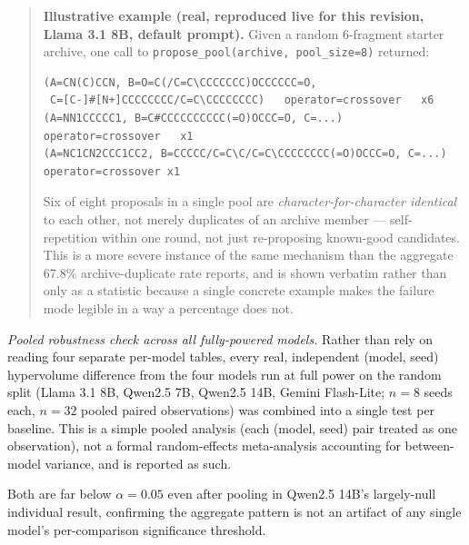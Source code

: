 \documentclass{article}
\begin{document}
\begin{quote}
\footnotesize
\textbf{Illustrative example (real, reproduced live for this revision, Llama 3.1 8B, default
prompt).} Given a random 6-fragment starter archive, one call to
\texttt{propose\_pool(archive, pool\_size=8)} returned:
\begin{verbatim}
(A=CN(C)CCN, B=O=C(/C=C\CCCCCCC)OCCCCCC=O,
 C=[C-]#[N+]CCCCCCCC/C=C\CCCCCCCC)   operator=crossover   x6
(A=NN1CCCCC1, B=C#CCCCCCCCCC(=O)OCCC=O, C=...)             operator=crossover   x1
(A=NC1CN2CCC1CC2, B=CCCCC/C=C\C/C=C\CCCCCCCC(=O)OCCC=O, C=...) operator=crossover x1
\end{verbatim}
Six of eight proposals in a single pool are \emph{character-for-character identical} to
each other, not merely duplicates of an archive member --- self-repetition within one
round, not just re-proposing known-good candidates. This is a more severe instance of
the same mechanism than the aggregate 67.8\% archive-duplicate rate reports, and is
shown verbatim rather than only as a statistic because a single concrete example makes
the failure mode legible in a way a percentage does not.
\end{quote}

\emph{Pooled robustness check across all fully-powered models.} Rather
than rely on reading four separate per-model tables, every real,
independent (model, seed) hypervolume difference from the four models
run at full power on the random split (Llama 3.1 8B, Qwen2.5 7B, Qwen2.5
14B, Gemini Flash-Lite; $n=8$ seeds each, $n=32$ pooled paired
observations) was combined into a single test per baseline. This is a
simple pooled analysis (each (model, seed) pair treated as one
observation), not a formal random-effects meta-analysis accounting for
between-model variance, and is reported as such.

\begin{center}
\end{center}

Both are far below $\alpha=0.05$ even after pooling in Qwen2.5 14B's
largely-null individual result, confirming the aggregate pattern is not
an artifact of any single model's per-comparison significance threshold.
\end{document}

